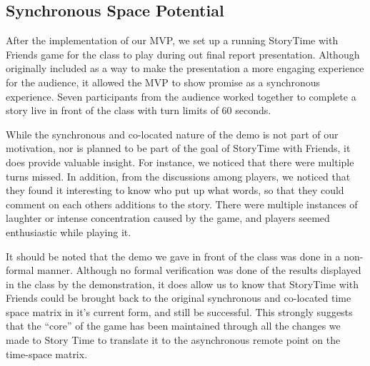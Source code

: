 \documentclass{sigchi}
\begin{document}
\subsection{Synchronous Space Potential} 
After the implementation of our MVP, we set up a running StoryTime with Friends game for the class to play during out final report presentation. Although originally included as a way to make the presentation a more engaging experience for the audience, it allowed the MVP to show promise as a synchronous experience. Seven participants from the audience worked together to complete a story live in front of the class with turn limits of 60 seconds.

While the synchronous and co-located nature of the demo is not part of our motivation, nor is planned to be part of the goal of StoryTime with Friends, it does provide valuable insight. For instance, we noticed that there were multiple turns missed. In addition, from the discussions among players, we noticed that they found it interesting to know who put up what words, so that they could comment on each others additions to the story. There were multiple instances of laughter or intense concentration caused by the game, and players seemed enthusiastic while playing it.

It should be noted that the demo we gave in front of the class was done in a non-formal manner. Although no formal verification was done of the results displayed in the class by the demonstration, it does allow us to know that StoryTime with Friends could be brought back to the original synchronous and co-located time space matrix in it's current form, and still be successful. This strongly suggests that the ``core'' of the game has been maintained through all the changes we made to Story Time to translate it to the asynchronous remote point on the time-space matrix.
\end{document}
